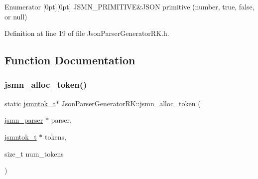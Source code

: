 \begin{DoxyEnumFields}{Enumerator}
[0pt][0pt]{}\mbox{\label{namespace_json_parser_generator_r_k_a45d8af9d310679633d258ed9b2caeeb3af36fefddaeac9a91bc69c938c8924568}} 
J\+S\+M\+N\+\_\+\+P\+R\+I\+M\+I\+T\+I\+VE&J\+S\+ON primitive (number, true, false, or null) \\
\hline

\end{DoxyEnumFields}


Definition at line 19 of file Json\+Parser\+Generator\+R\+K.\+h.



\subsection{Function Documentation}
\mbox{\label{namespace_json_parser_generator_r_k_a5b9c58cf485e408ef0b95c201674a1bc}} 
\subsubsection{\texorpdfstring{jsmn\+\_\+alloc\+\_\+token()}{jsmn\_alloc\_token()}}
{\footnotesize\ttfamily static \hyperlink{struct_json_parser_generator_r_k_1_1jsmntok__t}{jsmntok\+\_\+t}$\ast$ Json\+Parser\+Generator\+R\+K\+::jsmn\+\_\+alloc\+\_\+token (\begin{DoxyParamCaption}\item[{\hyperlink{struct_json_parser_generator_r_k_1_1jsmn__parser}{jsmn\+\_\+parser} $\ast$}]{parser,  }\item[{\hyperlink{struct_json_parser_generator_r_k_1_1jsmntok__t}{jsmntok\+\_\+t} $\ast$}]{tokens,  }\item[{size\+\_\+t}]{num\+\_\+tokens }\end{DoxyParamCaption})\hspace{0.3cm}{\ttfamily [static]}}

